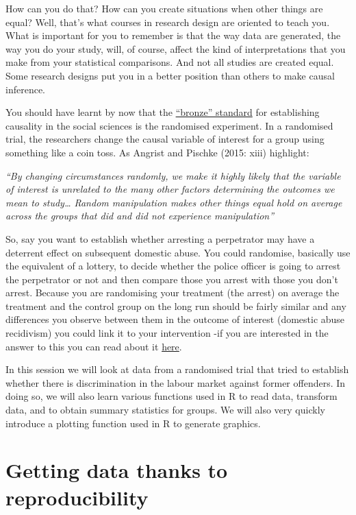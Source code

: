 \documentclass[
]{book}
\begin{document}
How can you do that? How can you create situations when other things are equal? Well, that's what courses in research design are oriented to teach you. What is important for you to remember is that the way data are generated, the way you do your study, will, of course, affect the kind of interpretations that you make from your statistical comparisons. And not all studies are created equal. Some research designs put you in a better position than others to make causal inference.

You should have learnt by now that the \href{https://link.springer.com/article/10.1007/s11292-005-3538-2}{``bronze'' standard} for establishing causality in the social sciences is the randomised experiment. In a randomised trial, the researchers change the causal variable of interest for a group using something like a coin toss. As Angrist and Pischke (2015: xiii) highlight:

\emph{``By changing circumstances randomly, we make it highly likely that the variable of interest is unrelated to the many other factors determining the outcomes we mean to study\ldots{} Random manipulation makes other things equal hold on average across the groups that did and did not experience manipulation''}

So, say you want to establish whether arresting a perpetrator may have a deterrent effect on subsequent domestic abuse. You could randomise, basically use the equivalent of a lottery, to decide whether the police officer is going to arrest the perpetrator or not and then compare those you arrest with those you don't arrest. Because you are randomising your treatment (the arrest) on average the treatment and the control group on the long run should be fairly similar and any differences you observe between them in the outcome of interest (domestic abuse recidivism) you could link it to your intervention -if you are interested in the answer to this you can read about it \href{http://niccsa.org/uploads/file/f815aa02a0804639a53bb4a800952235/EFFECTSOFARRESTONINTIMATEPARTNERVIOLENCE.pdf}{here}.

In this session we will look at data from a randomised trial that tried to establish whether there is discrimination in the labour market against former offenders. In doing so, we will also learn various functions used in R to read data, transform data, and to obtain summary statistics for groups. We will also very quickly introduce a plotting function used in R to generate graphics.

\hypertarget{getting-data-thanks-to-reproducibility}{%
\section{Getting data thanks to reproducibility}\label{getting-data-thanks-to-reproducibility}}
\end{document}
